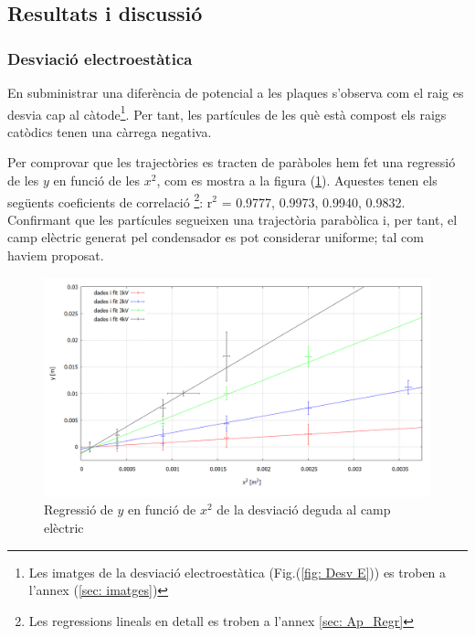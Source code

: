 \documentclass[11pt]{article}
\numberwithin{equation}{section}
\numberwithin{figure}{section}
\numberwithin{table}{section}
\begin{document}
\newpage
\subsection{Resultats i discussió}

\subsubsection{Desviació electroestàtica}\label{sec: desv_electr}

En subministrar una diferència de potencial a les plaques s'observa com el raig es desvia cap al càtode\footnote{Les imatges de la desviació electroestàtica (Fig.(\ref{fig: Desv E})) es troben a l'annex (\ref{sec: imatges}) }. Per tant, les partícules de les què està compost els raigs catòdics tenen una càrrega negativa.

 Per comprovar que les trajectòries es tracten de paràboles hem fet una regressió de les $y$ en funció de les $x^2$, com es mostra a la figura (\ref{fig: Regressió Desv E}). Aquestes tenen els següents coeficients de correlació \footnote{Les regressions lineals en detall es troben a l'annex \ref{sec: Ap_Regr}}:
 r$^2$ = 0.9777, 0.9973, 0.9940, 0.9832. Confirmant que les partícules segueixen una trajectòria parabòlica i, per tant, el camp elèctric generat pel condensador es pot considerar uniforme; tal com haviem proposat. 
\begin{figure}[H]
    \centering
    \begin{minipage}{0.75\textwidth}
    \centering
        \includegraphics[width=1\linewidth]{Plot yvsx.PNG}
        \caption{Regressió de $y$ en funció de $x^2$  de la desviació deguda al camp elèctric}
        \label{fig: Regressió Desv E}
    \end{minipage}
\end{figure}
\end{document}
